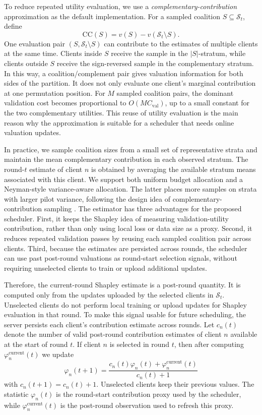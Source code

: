 \documentclass[journal]{IEEEtran}
\begin{document}
To reduce repeated utility evaluation, we use a \emph{complementary-contribution} approximation as the default implementation. For a sampled coalition $S \subseteq \mathcal{S}_t$, define
\begin{equation}
\mathrm{CC}(S) = v(S) - v(\mathcal{S}_t \setminus S).
\end{equation}
One evaluation pair $(S,\mathcal{S}_t \setminus S)$ can contribute to the estimates of multiple clients at the same time. Clients inside $S$ receive the sample in the $|S|$-stratum, while clients outside $S$ receive the sign-reversed sample in the complementary stratum. In this way, a coalition/complement pair gives valuation information for both sides of the partition. It does not only evaluate one client's marginal contribution at one permutation position. For $M$ sampled coalition pairs, the dominant validation cost becomes proportional to $O(M C_{\mathrm{val}})$, up to a small constant for the two complementary utilities. This reuse of utility evaluation is the main reason why the approximation is suitable for a scheduler that needs online valuation updates.

In practice, we sample coalition sizes from a small set of representative strata and maintain the mean complementary contribution in each observed stratum. The round-$t$ estimate of client $n$ is obtained by averaging the available stratum means associated with this client. We support both uniform budget allocation and a Neyman-style variance-aware allocation. The latter places more samples on strata with larger pilot variance, following the design idea of complementary-contribution sampling \cite{sun2024complementary}. The estimator has three advantages for the proposed scheduler. First, it keeps the Shapley idea of measuring validation-utility contribution, rather than only using local loss or data size as a proxy. Second, it reduces repeated validation passes by reusing each sampled coalition pair across clients. Third, because the estimates are persisted across rounds, the scheduler can use past post-round valuations as round-start selection signals, without requiring unselected clients to train or upload additional updates.

Therefore, the current-round Shapley estimate is a post-round quantity. It is computed only from the updates uploaded by the selected clients in $\mathcal{S}_t$. Unselected clients do not perform local training or upload updates for Shapley evaluation in that round. To make this signal usable for future scheduling, the server persists each client's contribution estimate across rounds. Let $c_n(t)$ denote the number of valid post-round contribution estimates of client $n$ available at the start of round $t$. If client $n$ is selected in round $t$, then after computing $\varphi_n^{\text{current}}(t)$ we update
\begin{equation}
\varphi_n(t+1) =
\frac{c_n(t)\varphi_n(t) + \varphi_n^{\text{current}}(t)}{c_n(t)+1}
\end{equation}
with $c_n(t+1)=c_n(t)+1$. Unselected clients keep their previous values. The statistic $\varphi_n(t)$ is the round-start contribution proxy used by the scheduler, while $\varphi_n^{\text{current}}(t)$ is the post-round observation used to refresh this proxy.
\end{document}
